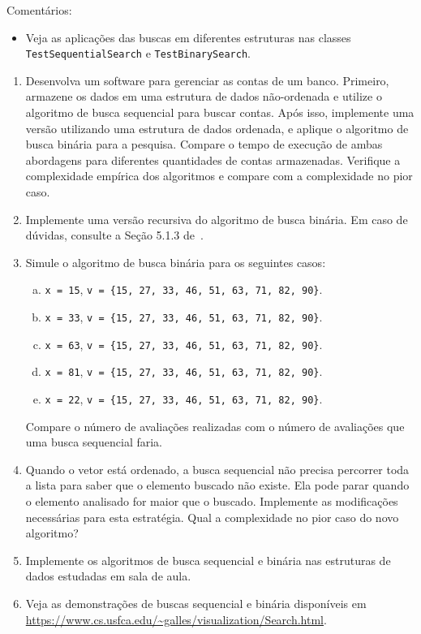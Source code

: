 \medskip

{\color{redtext}
	Comentários:
	\begin{itemize}
		\item Veja as aplicações das buscas em diferentes estruturas nas classes \texttt{TestSequentialSearch} e \texttt{TestBinarySearch}.
	\end{itemize}
}

\clearpage


\begin{enumerate}
	\item Desenvolva um software para gerenciar as contas de um banco. Primeiro, armazene os dados em uma estrutura de dados não-ordenada e utilize o algoritmo de busca sequencial para buscar contas. Após isso, implemente uma versão utilizando uma estrutura de dados ordenada, e aplique o algoritmo de busca binária para a pesquisa. Compare o tempo de execução de ambas abordagens para diferentes quantidades de contas armazenadas. Verifique a complexidade empírica dos algoritmos e compare com a complexidade no pior caso.

	\item Implemente uma versão recursiva do algoritmo de busca binária. Em caso de dúvidas, consulte a Seção 5.1.3 de~\cite{GoodrichEtAl2014}.
	
	\item Simule o algoritmo de busca binária para os seguintes casos:
	\begin{enumerate}[a)]
		\item \texttt{x = 15}, \texttt{v = \{15, 27, 33, 46, 51, 63, 71, 82, 90\}}.
		\item \texttt{x = 33}, \texttt{v = \{15, 27, 33, 46, 51, 63, 71, 82, 90\}}.
		\item \texttt{x = 63}, \texttt{v = \{15, 27, 33, 46, 51, 63, 71, 82, 90\}}.
		\item \texttt{x = 81}, \texttt{v = \{15, 27, 33, 46, 51, 63, 71, 82, 90\}}.
		\item \texttt{x = 22}, \texttt{v = \{15, 27, 33, 46, 51, 63, 71, 82, 90\}}.
	\end{enumerate}
	Compare o número de avaliações realizadas com o número de avaliações que uma busca sequencial faria.
	
	\item Quando o vetor está ordenado, a busca sequencial não precisa percorrer toda a lista para saber que o elemento buscado não existe. Ela pode parar quando o elemento analisado for maior que o buscado. Implemente as modificações necessárias para esta estratégia. Qual a complexidade no pior caso do novo algoritmo?
	
	\item Implemente os algoritmos de busca sequencial e binária nas estruturas de dados estudadas em sala de aula.
	
	\item Veja as demonstrações de buscas sequencial e binária disponíveis em \url{https://www.cs.usfca.edu/~galles/visualization/Search.html}. 
\end{enumerate}

\medskip

\begingroup
	\footnotesize
	\renewcommand{\chapter}[2]{}%
	
	
\endgroup

